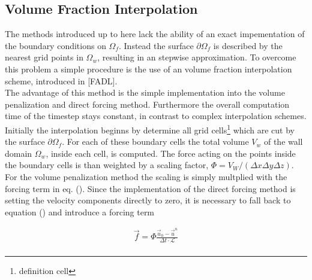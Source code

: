 \newpage

\subsection{Volume Fraction Interpolation}

The methods introduced up to here lack the ability of an exact impementation of the boundary conditions on $\Omega_f$.
Instead the surface $\partial \Omega_f$ is described by the nearest grid points in $\Omega_w$, resulting in an
stepwise approximation.
To overcome this problem a simple procedure is the use of an volume fraction interpolation scheme, introduced in [FADL].\\
The advantage of this method is the simple implementation into the volume penalization and direct forcing method.
Furthermore the overall computation time of the timestep stays constant, in  contrast to complex interpolation schemes.\\
Initially the interpolation beginns by determine all grid cells\footnote{definition cell} which are cut by the surface $\partial \Omega_f$.
For each of these boundary cells the total volume $V_w$ of the wall domain $\Omega_w$, inside each cell, is computed.
The force acting on the points inside the boundary cells is than weighted by a scaling factor, $\Phi = V_W/(\Delta x \Delta y \Delta z)$.
For the volume penalization method the scaling is simply multplied with the forcing term in eq. ().
Since the implementation of the direct forcing method is setting the velocity components directly to zero, it is necessary to
fall back to equation () and introduce a forcing term

\begin{align}
    \vec{f} = \Phi \frac{\vec{u}_0 -\vec{u}^n}{\Delta t\cdot \mathscr{L}}\\
\end{align}

